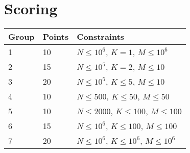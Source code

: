 \section*{Scoring}
\begin{tabular}{|l|l|l|}
    \hline
    Group & Points & Constraints \\ \hline
    1     &  10  & $N \leq 10^6$, $K = 1$, $M \leq 10^6$ \\ \hline
    2     &  15  & $N \leq 10^5$, $K = 2$, $M \leq 10$ \\ \hline
    3     &  20  & $N \leq 10^5$, $K \leq 5$, $M \leq 10$ \\ \hline
    4     &  10  & $N \leq 500$, $K \leq 50$, $M \leq 50$ \\ \hline
    5     &  10  & $N \leq 2000$, $K \leq 100$, $M \leq 100$ \\ \hline
    6     &  15  & $N \leq 10^6$, $K \leq 100$, $M \leq 100$ \\ \hline
    7     &  20  & $N \leq 10^6$, $K \leq 10^6$, $M \leq 10^6$ \\ \hline
\end{tabular}

